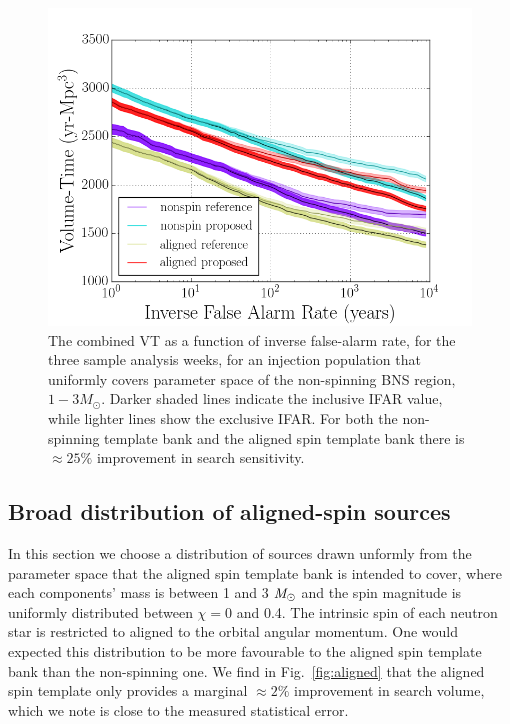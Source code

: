\begin{figure}
\centering
\includegraphics[width=1.0\textwidth]{papers/bns_o1_dev/figures/ns_combined.png}
\caption{\label{fig:nonspin} 
The combined VT as a function of inverse false-alarm rate, for the
three sample analysis weeks, for an injection population that uniformly covers parameter space of the non-spinning BNS region, $1- 3M_\odot$. Darker shaded lines indicate the inclusive IFAR value, while lighter lines show the exclusive IFAR. For both the non-spinning template bank and the aligned spin template bank there is $\approx 25 \%$ improvement in search sensitivity.
}
\end{figure}

\subsection{Broad distribution of aligned-spin sources}
\label{sec:baligned}

In this section we choose a distribution of sources drawn unformly from the parameter space that the aligned spin template bank is intended to cover, where each components' mass is between 1 and 3 $\mathit{M}_\odot$ and the spin magnitude is uniformly distributed between $\chi=$0 and 0.4. The intrinsic spin of each neutron star is restricted to aligned to the orbital angular momentum. One would expected this distribution to be more favourable to the aligned spin template bank than the non-spinning one. We find in Fig.~\ref{fig:aligned} that the aligned spin template only provides a marginal $\approx 2\%$ improvement in search volume, which we note is close to the measured statistical error. 

